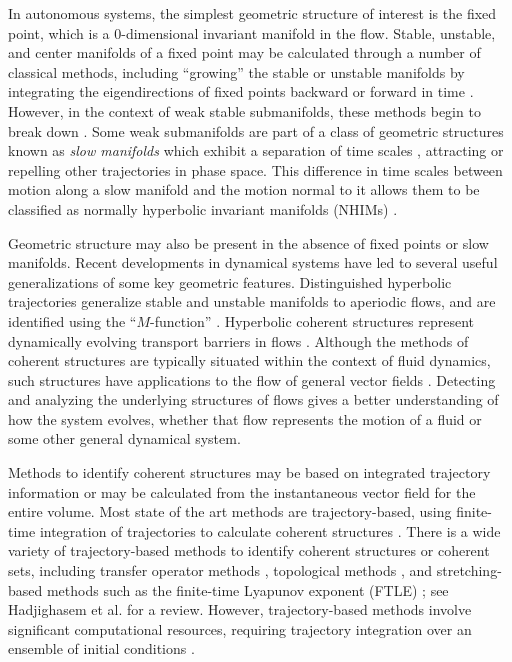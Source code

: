 \documentclass[twocolumn]{svjour3}
\begin{document}
In autonomous systems, the simplest geometric structure of interest is the fixed point, which is a 0-dimensional invariant manifold in the flow. Stable, unstable, and center manifolds of a fixed point may be calculated through a number of classical methods, including ``growing'' the stable or unstable manifolds by integrating the eigendirections of fixed points backward or forward in time \cite{koon2008dynamical}. However, in the context of weak stable submanifolds, these methods begin to break down \cite{nave2018global}. Some weak submanifolds are part of a class of geometric structures known as \textit{slow manifolds} which exhibit a separation of time scales \cite{kuehn2016multiple}, attracting or repelling other trajectories in phase space. This difference in time scales between motion along a slow manifold and the motion normal to it allows them to be classified as normally hyperbolic invariant manifolds (NHIMs) \cite{wiggins2013normally}.

Geometric structure may also be present in the absence of fixed points or slow manifolds. Recent developments in dynamical systems have led to several useful generalizations of some key geometric features. Distinguished hyperbolic trajectories generalize stable and unstable manifolds to aperiodic flows, and are identified using the ``$M$-function'' \cite{madrid2009distinguished}. Hyperbolic coherent structures represent dynamically evolving transport barriers in flows \cite{shadden2005definition,shadden2011lagrangian}. Although the methods of coherent structures are typically situated within the context of fluid dynamics, such structures have applications to the flow of general vector fields \cite{aldridge2006direct,gawlik2009lagrangian,tanaka2010mathematical,nave2018global}. Detecting and analyzing the underlying structures of flows gives a better understanding of how the system evolves, whether that flow represents the motion of a fluid or some other general dynamical system.

Methods to identify coherent structures may be based on integrated trajectory information or may be calculated from the instantaneous vector field for the entire volume. Most state of the art methods are trajectory-based, using finite-time integration of trajectories to calculate coherent structures \cite{balasuriya2018generalized,shadden2011lagrangian}. There is a wide variety of trajectory-based methods to identify coherent structures or coherent sets, including transfer operator methods \cite{dellnitz2001algorithms,froyland2015rough}, topological methods \cite{allshouse2012detecting,budivsic2015finite}, and stretching-based methods such as the finite-time Lyapunov exponent (FTLE) \cite{shadden2005definition}; see Hadjighasem et al. \cite{hadjighasem2017critical} for a review. However, trajectory-based methods involve significant computational resources, requiring trajectory integration over an ensemble of initial conditions \cite{ameli2014development,brunton2010fast}.
\end{document}

